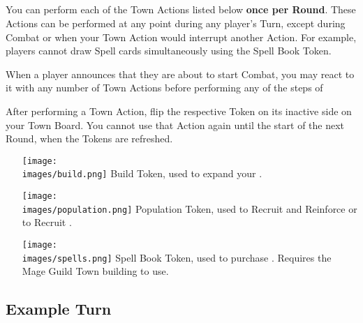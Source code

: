 \begin{multicols*}{2}
\subsection*{}
You can perform each of the Town Actions listed below \textbf{once per Round}.
These Actions can be performed at any point during any player's Turn, except during Combat or when your Town Action would interrupt another Action.
For example, players cannot draw Spell cards simultaneously using the Spell Book Token.\par
When a player announces that they are about to start Combat, you may react to it with any number of Town Actions before performing any of the steps of \par
After performing a Town Action, flip the respective Token on its inactive side on your Town Board.
You cannot use that Action again until the start of the next Round, when the Tokens are refreshed.
\begin{itemize}
  \item [{\texttt{[image: \\images/build.png]}}] Build Token, used to expand your .
  \item [{\texttt{[image: \\images/population.png]}}] Population Token, used to Recruit and Reinforce  or to Recruit .
  \item [{\texttt{[image: \\images/spells.png]}}]Spell Book Token, used to purchase . Requires the Mage Guild Town building to use.
\end{itemize}

\vspace*{\fill}
\vspace*{\fill}

\subsection*{Example Turn}


\end{multicols*}
